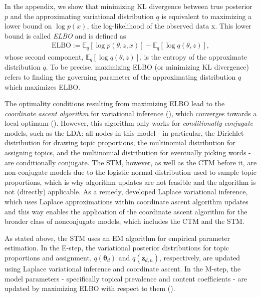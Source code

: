 In the appendix, we show that minimizing KL divergence between true posterior $p$ and the approximating variational distribution $q$ is equivalent to maximizing a lower bound on $\log p(x)$, the log-likelihood of the observed data x. This lower bound is called \textit{ELBO} and is defined as
\begin{align*}
\text{ELBO} := \mathbb{E}_q[\log p(\theta,z,x)] - \mathbb{E}_q[\log q(\theta,z)],
\end{align*}
whose second component, $\mathbb{E}_q[\log q(\theta,z)]$, is the entropy of the approximate distribution $q$. To be precise, maximizing ELBO (or minimizing KL divergence) refers to finding the governing parameter of the approximating distribution $q$ which maximizes ELBO.

The optimality conditions resulting from maximizing ELBO lead to the \textit{coordinate ascent algorithm} for variational inference (\citealp{wang2013variational}), which converges towards a local optimum (\citealp{bishop2006pattern}). However, this algorithm only works for \textit{conditionally conjugate} models, such as the LDA: all nodes in this model - in particular, the Dirichlet distribution for drawing topic proportions, the multinomial distribution for assigning topics, and the multinomial distribution for eventually picking words - are conditionally conjugate. The STM, however, as well as the CTM before it, are non-conjugate models due to the logistic normal distribution used to sample topic proportions, which is why algorithm updates are not feasible and the algorithm is not (directly) applicable. As a remedy, \cite{wang2013variational} developed Laplace variational inference, which uses Laplace approximations within coordinate ascent algorithm updates and this way enables the application of the coordinate ascent algorithm for the broader class of nonconjugate models, which includes the CTM and the STM.

As stated above, the STM uses an EM algorithm for empirical parameter estimation. In the E-step, the variational posterior distributions for topic proportions and assignment, $q(\boldsymbol{\theta}_d)$ and $q(\boldsymbol{z}_{d,n})$, respectively, are updated using Laplace variational inference and coordinate ascent. In the M-step, the model parameters - specifically topical prevalence and content coefficients - are updated by maximizing ELBO with respect to them (\citealp{roberts2016model}).